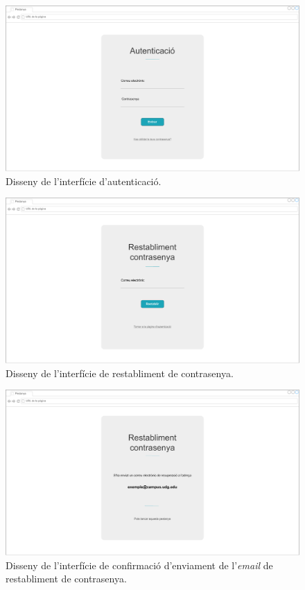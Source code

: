 \documentclass[a4paper,12pt]{ThesisStyle}
\begin{document}
\begin{figure}[H]
	\centering
	\includegraphics[width=\textwidth]{assets/interfaces/login/login.pdf}
	\caption{\label{img:login}Disseny de l'interfície d'autenticació.}
\end{figure}

\begin{figure}[H]
	\centering
	\includegraphics[width=\textwidth]{assets/interfaces/login/passwordRestablishment.pdf}
	\caption{\label{img:passwordRestablishment}Disseny de l'interfície de restabliment de contrasenya.}
\end{figure}

\begin{figure}[H]
	\centering
	\includegraphics[width=\textwidth]{assets/interfaces/login/passwordRestablished.pdf}
	\caption{\label{img:passwordRestablished}Disseny de l'interfície de confirmació d'enviament de l'\textit{email} de restabliment de contrasenya.}
\end{figure}
\end{document}
